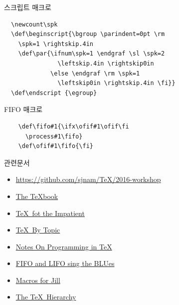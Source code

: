 \documentclass{beamer}
\begin{document}
%
\begin{frame}[fragile]{스크립트 매크로}
  \begin{verbatim}
  \newcount\spk
  \def\beginscript{\bgroup \parindent=0pt \rm
    \spk=1 \rightskip.4in
    \def\par{\ifnum\spk=1 \endgraf \sl \spk=2
               \leftskip.4in \rightskip0in
             \else \endgraf \rm \spk=1
               \leftskip0in \rightskip.4in \fi}}
  \def\endscript {\egroup}
  \end{verbatim}
\end{frame}


%
\begin{frame}[fragile]{FIFO 매크로}
  \large
  \begin{verbatim}
    \def\fifo#1{\ifx\ofif#1\ofif\fi
      \process#1\fifo}
    \def\ofif#1\fifo{\fi}
  \end{verbatim}
\end{frame}


%
\begin{frame}{관련문서}
  \begin{itemize}
  \item \url{https://github.com/sjnam/TeX/2016-workshop}
  \item \href{http://ftp.ktug.org/tex-archive/systems/knuth/dist/tex/}
    {The \TeX book}
  \item \href{http://ftp.ktug.org/tex-archive/info/impatient/book.pdf}
    {\TeX\ fot the Impatient}
  \item \href{http://ftp.ktug.org/tex-archive/info/texbytopic/TeXbyTopic.pdf}
    {\TeX\ By Topic}
  \item \href{http://pgfplots.sourceforge.net/TeX-programming-notes.pdf}
    {Notes On Programming in TeX}
  \item \href{https://www.tug.org/TUGboat/tb14-1/tb38laan.pdf}
    {FIFO and LIFO sing the BLUes}
  \item \href{https://www.tug.org/TUGboat/tb08-3/tb19knut.pdf}
    {Macros for Jill}
  \item \href{https://www.tug.org/TUGboat/tb15-1/tb42arseneau.pdf}
    {The TeX\ Hierarchy}
  \end{itemize}
\end{frame}


%
\end{document}
